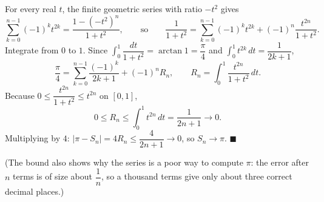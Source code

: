 For every real $t$, the finite geometric series with ratio $-t^2$ gives
\[
\sum_{k=0}^{n-1}(-1)^kt^{2k}=\dfrac{1-(-t^2)^n}{1+t^2},\qquad\text{so}\qquad\dfrac{1}{1+t^2}=\sum_{k=0}^{n-1}(-1)^kt^{2k}+(-1)^n\dfrac{t^{2n}}{1+t^2}.
\]
Integrate from $0$ to $1$. Since $\displaystyle\int_0^1\dfrac{dt}{1+t^2}=\arctan1=\dfrac{\pi}{4}$ and $\displaystyle\int_0^1t^{2k}\,dt=\dfrac{1}{2k+1}$,
\[
\dfrac{\pi}{4}=\sum_{k=0}^{n-1}\dfrac{(-1)^k}{2k+1}+(-1)^nR_n,\qquad R_n=\int_0^1\dfrac{t^{2n}}{1+t^2}\,dt .
\]
Because $0\le\dfrac{t^{2n}}{1+t^2}\le t^{2n}$ on $[0,1]$,
\[
0\le R_n\le\int_0^1t^{2n}\,dt=\dfrac{1}{2n+1}\to0 .
\]
Multiplying by $4$: $|\pi-S_n|=4R_n\le\dfrac{4}{2n+1}\to0$, so $S_n\to\pi$. $\blacksquare$

(The bound also shows why the series is a poor way to compute $\pi$: the error after $n$ terms is of size about $\dfrac{1}{n}$, so a thousand terms give only about three correct decimal places.)
